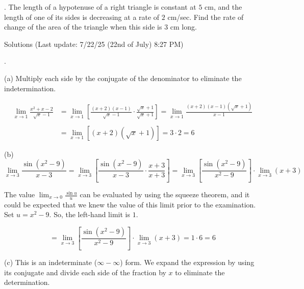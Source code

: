 \documentclass{article}
\begin{document}
\hfill

. The length of a hypotenuse of a right triangle is constant at $5$ cm, and the
length of one of its sides is decreasing at a rate of $2$ cm/sec. Find the rate of change of the area of the triangle when this side is $3$ cm long.

\newpage

\begin{center}
Solutions (Last update: 7/22/25 (22nd of July) 8:27 PM)
\end{center}

.

\hfill

\noindent (a) Multiply each side by the conjugate of the denominator to eliminate the indetermination.

\begin{align*}
\lim_{x\to1}\frac{x^2+x-2}{\sqrt x -1}&=\lim_{x\to1}\left[\frac{(x+2)(x-1)}{\sqrt x -1}\cdot \frac{\sqrt x + 1}{\sqrt x +1}\right]=\lim_{x\to1}\frac{(x+2)(x-1)\left(\sqrt x + 1\right)}{x-1}\\\\&=\lim_{x\to1}\left[(x+2)\left(\sqrt x + 1\right)\right] =3\cdot 2 = \boxed6
\end{align*}

\hfill

\noindent (b)
\begin{equation*}
\lim_{x\to 3}\frac{\sin(x^2-9)}{x-3}=\lim_{x\to 3}\left[\frac{\sin(x^2-9)}{x-3}\cdot\frac{x+3}{x+3}\right]=\lim_{x\to3}\left[\frac{\sin(x^2-9)}{x^2-9}\right]\cdot\lim_{x\to 3}(x+3)
\end{equation*}

\hfill

\noindent The value $\displaystyle \lim_{x\to0}\frac{\sin u}{u}$ can be evaluated by using the squeeze theorem, and it could be expected that we knew the value of this limit prior to the examination. Set $u=x^2-9$. So, the left-hand limit is $1$.

\begin{equation*}
=\lim_{x\to3}\left[\frac{\sin(x^2-9)}{x^2-9}\right]\cdot\lim_{x\to 3}(x+3) = 1\cdot 6 = \boxed6
\end{equation*}

\hfill

\noindent (c) This is an indeterminate ($\infty - \infty$) form. We expand the expression by using its conjugate and divide each side of the fraction by $x$ to eliminate the determination.
\end{document}
